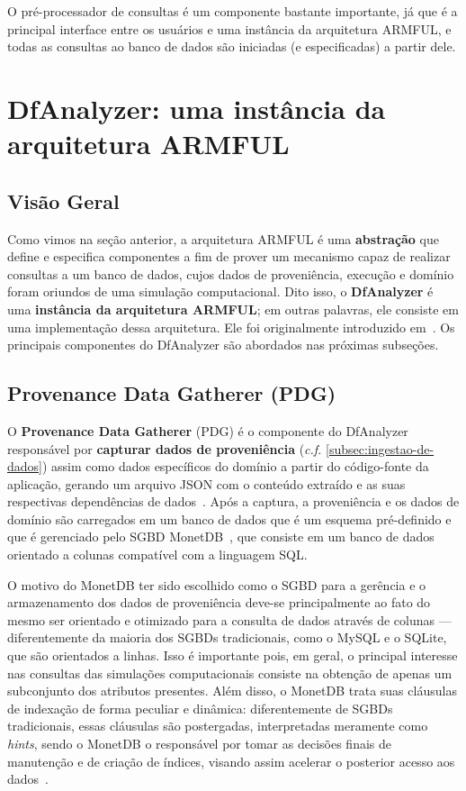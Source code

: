 O pré-processador de consultas é um componente bastante importante, já que é a principal interface entre os usuários e uma instância da arquitetura ARMFUL, e todas as consultas ao banco de dados são iniciadas (e especificadas) a partir dele.

\section{DfAnalyzer: uma instância da arquitetura ARMFUL}%
\label{sec:dfanalyzer-uma-instancia-da-arquitetura-armful}

\subsection{Visão Geral}%
\label{subsec:dfanalyzer-visao-geral}

Como vimos na seção anterior, a arquitetura ARMFUL é uma \textbf{abstração} que define e especifica componentes a fim de prover um mecanismo capaz de realizar consultas a um banco de dados, cujos dados de proveniência, execução e domínio foram oriundos de uma simulação computacional. Dito isso, o \textbf{DfAnalyzer} é uma \textbf{instância da arquitetura ARMFUL}; em outras palavras, ele consiste em uma implementação dessa arquitetura. Ele foi originalmente introduzido em~\cite{silva2016situ}. Os principais componentes do DfAnalyzer são abordados nas próximas subseções.

\subsection{Provenance Data Gatherer (PDG)}

O \textbf{Provenance Data Gatherer} (PDG) é o componente do DfAnalyzer responsável por \textbf{capturar dados de proveniência} (\textit{c.f.} \autoref{subsec:ingestao-de-dados}) assim como dados específicos do domínio a partir do código-fonte da aplicação, gerando um arquivo JSON com o conteúdo extraído e as suas respectivas dependências de dados~\cite{silva2016situ}. Após a captura, a proveniência e os dados de domínio são carregados em um banco de dados que é um esquema pré-definido e que é gerenciado pelo SGBD MonetDB~\cite{boncz2008breaking}, que consiste em um banco de dados orientado a colunas compatível com a linguagem SQL.

O motivo do MonetDB ter sido escolhido como o SGBD para a gerência e o armazenamento dos dados de proveniência deve-se principalmente ao fato do mesmo ser orientado e otimizado para a consulta de dados através de colunas --- diferentemente da maioria dos SGBDs tradicionais, como o MySQL e o SQLite, que são orientados a linhas. Isso é importante pois, em geral, o principal interesse nas consultas das simulações computacionais consiste na obtenção de apenas um subconjunto dos atributos presentes.
Além disso, o MonetDB trata suas cláusulas de indexação de forma peculiar e dinâmica: diferentemente de SGBDs tradicionais, essas cláusulas são postergadas, interpretadas meramente como \textit{hints}, sendo o MonetDB o responsável por tomar as decisões finais de manutenção e de criação de índices, visando assim acelerar o posterior acesso aos dados~\cite{url:monetdb}.

